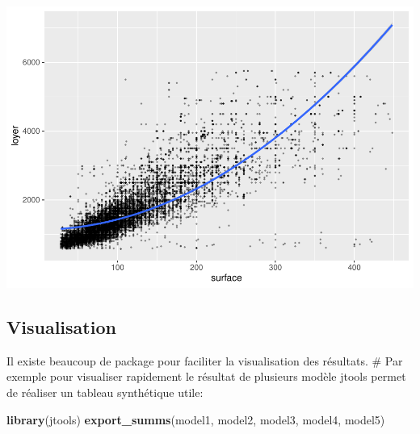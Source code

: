 \documentclass[
]{book}
\newenvironment{Shaded}{\begin{snugshade}}{\end{snugshade}}
\newcommand{\FunctionTok}[1]{\textcolor[rgb]{0.13,0.29,0.53}{\textbf{#1}}}
\newcommand{\NormalTok}[1]{#1}
\begin{document}
\includegraphics{bookdown-demo_files/figure-latex/unnamed-chunk-17-1.pdf}

\hypertarget{visualisation}{%
\subsection{Visualisation}\label{visualisation}}

Il existe beaucoup de package pour faciliter la visualisation des
résultats. \# Par exemple pour visualiser rapidement le résultat de
plusieurs modèle jtools permet de réaliser un tableau synthétique utile:

\begin{Shaded}
\begin{Highlighting}[]
\FunctionTok{library}\NormalTok{(jtools)}
\FunctionTok{export\_summs}\NormalTok{(model1, model2, model3, model4, model5)}
\end{Highlighting}
\end{Shaded}

 
  \providecommand{\huxb}[2]{\arrayrulecolor[RGB]{#1}\global\arrayrulewidth=#2pt}
  \providecommand{\huxvb}[2]{\color[RGB]{#1}\vrule width #2pt}
  \providecommand{\huxtpad}[1]{\rule{0pt}{#1}}
  \providecommand{\huxbpad}[1]{\rule[-#1]{0pt}{#1}}
\end{document}
